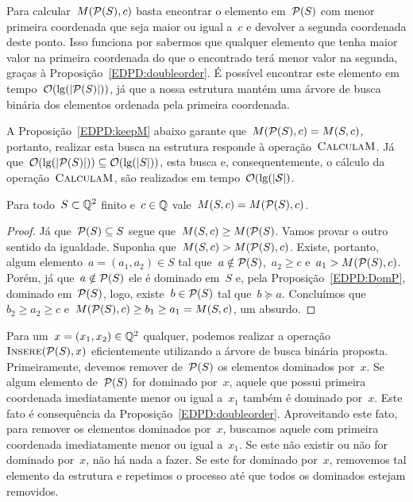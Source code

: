 Para calcular~$M(\mathcal{P}(S),c)$ basta encontrar o elemento em~$\mathcal{P}(S)$ com menor primeira coordenada que seja maior ou igual a~$c$ e devolver a segunda coordenada deste ponto. Isso funciona por sabermos que qualquer elemento que tenha maior valor na primeira coordenada do que o encontrado terá menor valor na segunda, graças à Proposição~\ref{EDPD:doubleorder}. É possível encontrar este elemento em tempo~$\mathcal{O}(\lg(|\mathcal{P}(S)|))$, já que a nossa estrutura mantém uma árvore de busca binária dos elementos ordenada pela primeira coordenada. 

A Proposição~\ref{EDPD:keepM} abaixo garante que~${ M(\mathcal{P}(S),c) = M(S,c) }$, portanto, realizar esta busca na estrutura responde à operação~$\textsc{CalculaM}$. Já que~${\mathcal{O}(\lg(|\mathcal{P}(S)|)) \subseteq \mathcal{O}(\lg(|S|))}$, esta busca e, consequentemente, o cálculo da operação~$\textsc{CalculaM}$, são realizados em tempo~$\mathcal{ O(\lg(|S|) }$.

\begin{prop} \label{EDPD:keepM}
Para todo~$S \subset \mathbb{Q}^2$ finito e~$c \in \mathbb{Q}$ vale~$M(S,c) = M(\mathcal{P}(S),c)$.
\end{prop}
\begin{proof}
Já que~${ \mathcal{P}(S) \subseteq S }$ segue que~${ M(S,c) \geq M(\mathcal{P}(S) }$. Vamos provar o outro sentido da igualdade. Suponha que~${ M(S,c) > M(\mathcal{P}(S),c) }$. Existe, portanto, algum elemento~$a = (a_1,a_2) \in S$ tal que~${ a \notin \mathcal{P}(S) }$,~${ a_2 \geq c }$ e~${ a_1 > M(\mathcal{P}(S),c) }$. Porém, já que~${ a \notin \mathcal{P}(S) }$ ele é dominado em~$S$ e, pela Proposição~\ref{EDPD:DomP}, dominado em~$\mathcal{P}(S)$, logo, existe~${ b \in \mathcal{P}(S) }$ tal que~${ b \succeq a }$. Concluímos que~${ b_2 \geq a_2 \geq c }$ e~${ M(\mathcal{P}(S),c) \geq b_1 \geq a_1 = M(S,c) }$, um absurdo.
\end{proof}

Para um~${ x = (x_1,x_2) \in \mathbb{Q}^2 }$ qualquer, podemos realizar a operação~$\textsc{Insere}(\mathcal{P}(S),x)$ eficientemente utilizando a árvore de busca binária proposta. Primeiramente, devemos remover de~$\mathcal{P}(S)$ os elementos dominados por~$x$. Se algum elemento de~$\mathcal{P}(S)$ for dominado por~$x$, aquele que possui primeira coordenada imediatamente menor ou igual a~$x_1$ também é dominado por~$x$. Este fato é consequência da Proposição~\ref{EDPD:doubleorder}. Aproveitando este fato, para remover os elementos dominados por~$x$, buscamos aquele com primeira coordenada imediatamente menor ou igual a~$x_1$. Se este não existir ou não for dominado por~$x$, não há nada a fazer. Se este for dominado por~$x$, removemos tal elemento da estrutura e repetimos o processo até que todos os dominados estejam removidos. 

